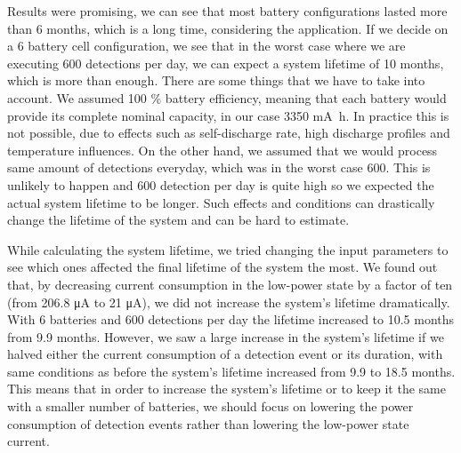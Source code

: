 Results were promising, we can see that most battery configurations lasted more than 6 months, which is a long time, considering the application.
If we decide on a 6 battery cell configuration, we see that in the worst case where we are executing 600 detections per day, we can expect a system lifetime of 10 months, which is more than enough.
There are some things that we have to take into account.
We assumed 100 \% battery efficiency, meaning that each battery would provide its complete nominal capacity, in our case 3350 \si{\milli\ampere\hour}.
In practice this is not possible, due to effects such as self-discharge rate, high discharge profiles and temperature influences.
On the other hand, we assumed that we would process same amount of detections everyday, which was in the worst case 600.
This is unlikely to happen and 600 detection per day is quite high so we expected the actual system lifetime to be longer.
Such effects and conditions can drastically change the lifetime of the system and can be hard to estimate.

While calculating the system lifetime, we tried changing the input parameters to see which ones affected the final lifetime of the system the most.
We found out that, by decreasing current consumption in the low-power state by a factor of ten (from 206.8 \si{\micro\ampere} to 21 \si{\micro\ampere}), we did not increase the system's lifetime dramatically.
With 6 batteries and 600 detections per day the lifetime increased to 10.5 months from 9.9 months.
However, we saw a large increase in the system's lifetime if we halved either the current consumption of a detection event or its duration, with same conditions as before the system's lifetime increased from 9.9 to 18.5 months.
This means that in order to increase the system's lifetime or to keep it the same with a smaller number of batteries, we should focus on lowering the power consumption of detection events rather than lowering the low-power state current.
